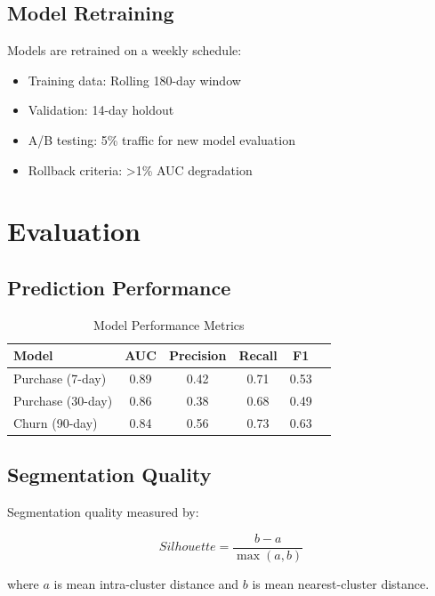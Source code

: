 \documentclass[11pt,a4paper]{article}
\begin{document}
\subsection{Model Retraining}

Models are retrained on a weekly schedule:

\begin{itemize}
    \item Training data: Rolling 180-day window
    \item Validation: 14-day holdout
    \item A/B testing: 5\% traffic for new model evaluation
    \item Rollback criteria: >1\% AUC degradation
\end{itemize}

\section{Evaluation}

\subsection{Prediction Performance}

\begin{table}[h]
\centering
\caption{Model Performance Metrics}
\begin{tabular}{lccccc}
\toprule
\textbf{Model} & \textbf{AUC} & \textbf{Precision} & \textbf{Recall} & \textbf{F1} \\
\midrule
Purchase (7-day) & 0.89 & 0.42 & 0.71 & 0.53 \\
Purchase (30-day) & 0.86 & 0.38 & 0.68 & 0.49 \\
Churn (90-day) & 0.84 & 0.56 & 0.73 & 0.63 \\
\bottomrule
\end{tabular}
\end{table}

\subsection{Segmentation Quality}

Segmentation quality measured by:

\begin{equation}
Silhouette = \frac{b - a}{\max(a, b)}
\end{equation}

where $a$ is mean intra-cluster distance and $b$ is mean nearest-cluster distance.
\end{document}
